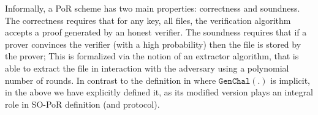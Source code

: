 Informally, a PoR scheme has two main properties: correctness and soundness. The correctness requires that for any key, all files, the verification algorithm accepts a proof generated by an honest verifier. The soundness requires that if  a prover convinces the verifier (with a high probability) then the file is  stored by the prover; This is formalized via the notion of an extractor algorithm, that is able to extract the file in interaction with the adversary using a polynomial number of  rounds. In contrast to the definition in \cite{DBLP:conf/asiacrypt/ShachamW08} where $\mathtt{GenChal}(.)$ is implicit, in the above we have explicitly defined  it, as its modified version  plays an integral role in SO-PoR definition (and protocol). 
